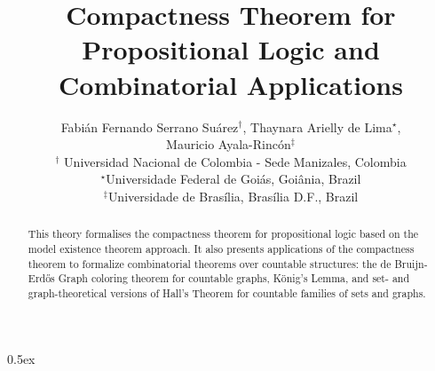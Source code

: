 \documentclass[11pt,a4paper]{article}
\begin{document}
\title{Compactness Theorem for Propositional Logic and Combinatorial Applications}
\author{Fabián Fernando Serrano Suárez$^\dag$,  Thaynara Arielly de Lima$^\star$, \\
Mauricio Ayala-Rincón$^\ddag$\\[2mm]
\mbox{}$^\dag$ Universidad Nacional de Colombia - 
Sede Manizales, Colombia \\[1mm]
\mbox{}$^\star$Universidade Federal de Goiás, Goiânia, Brazil\\[1mm] 
\mbox{}$^\ddag$Universidade de Brasília, Brasília D.F., Brazil\\
 }

\maketitle

\begin{abstract}
This theory formalises the compactness theorem for propositional 
logic based on the model existence theorem approach. 
It also presents applications of the compactness theorem to formalize 
combinatorial theorems over countable structures:  
the de Bruijn-Erd\H{o}s Graph coloring theorem for countable graphs, 
König's Lemma, and set- and graph-theoretical versions of Hall's Theorem for 
countable families of sets and graphs.
\end{abstract}




\tableofcontents

\parindent 0pt\parskip 0.5ex








%
\end{document}
